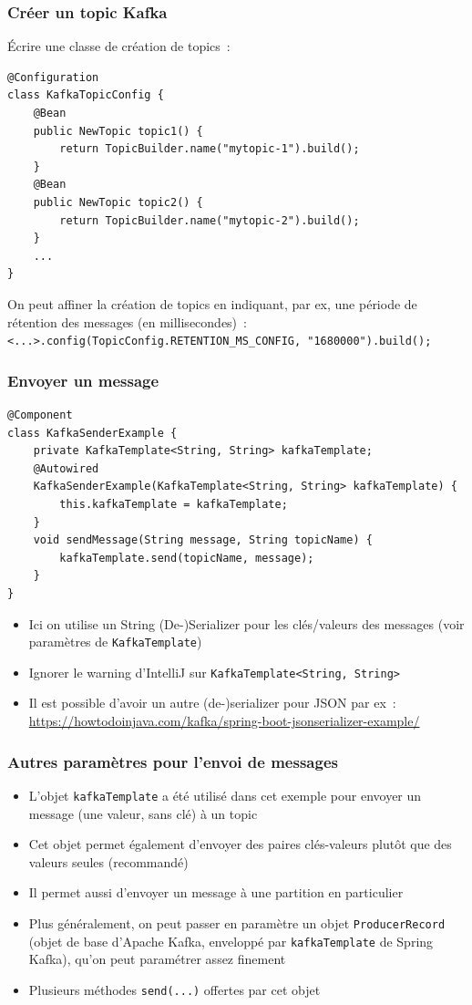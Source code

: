 \documentclass{beamer}
\begin{document}
\begin{frame}[fragile]
	\frametitle{Créer un topic Kafka}
Écrire une classe de création de topics~:

\begin{lstlisting}
@Configuration
class KafkaTopicConfig {	
	@Bean
	public NewTopic topic1() {
		return TopicBuilder.name("mytopic-1").build();
	}
	@Bean
	public NewTopic topic2() {
		return TopicBuilder.name("mytopic-2").build();
	}
	...
}
\end{lstlisting}
	
On peut affiner la création de topics en indiquant, par ex, une période de rétention des messages (en millisecondes)~:\\
\footnotesize
\texttt{<...>.config(TopicConfig.RETENTION\_MS\_CONFIG, "1680000").build();}
\normalsize
\end{frame} 

\begin{frame}[fragile]
	\frametitle{Envoyer un message}
\begin{lstlisting}
@Component
class KafkaSenderExample {	
	private KafkaTemplate<String, String> kafkaTemplate;	
	@Autowired
	KafkaSenderExample(KafkaTemplate<String, String> kafkaTemplate) {
		this.kafkaTemplate = kafkaTemplate;
	}	
	void sendMessage(String message, String topicName) {
		kafkaTemplate.send(topicName, message);
	}
}
\end{lstlisting}
	\begin{itemize}
		\item Ici on utilise un String (De-)Serializer pour les clés/valeurs des messages (voir paramètres de \texttt{KafkaTemplate})
		\item Ignorer le warning d'IntelliJ sur {\footnotesize \texttt{KafkaTemplate<String, String>}}
		\item Il est possible d'avoir un autre (de-)serializer pour JSON par ex~:\\
		\scriptsize
		\url{https://howtodoinjava.com/kafka/spring-boot-jsonserializer-example/}
		\normalsize
	\end{itemize}
\end{frame} 

\begin{frame}[fragile]
	\frametitle{Autres paramètres pour l'envoi de messages}
	\begin{itemize}
		\item L'objet \texttt{kafkaTemplate} a été utilisé dans cet exemple pour envoyer un message (une valeur, sans clé) à un topic
		\item Cet objet permet également d'envoyer des paires clés-valeurs plutôt que des valeurs seules (recommandé)
		\item Il permet aussi d'envoyer un message à une partition en particulier
		\item Plus généralement, on peut passer en paramètre un objet \texttt{ProducerRecord} (objet de base d'Apache Kafka, enveloppé par \texttt{kafkaTemplate} de Spring Kafka), qu'on peut paramétrer assez finement
		\item Plusieurs méthodes \texttt{send(...)} offertes par cet objet
	\end{itemize}
\end{frame} 
\end{document}
